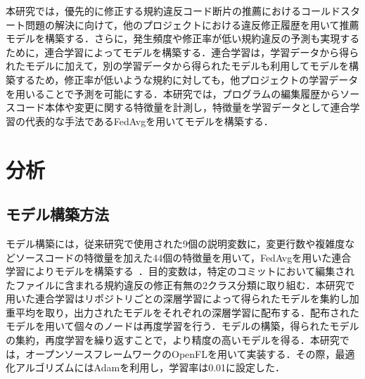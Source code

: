 \documentclass[uplatex,dvipdfmx,a4paper,twocolumn,base=11pt,jbase=11pt,ja=standard]{bxjsarticle}  %
\newcommand{\todo}[1]{\colorbox{yellow}{{\bf TODO}:}{\color{red} {\textbf{[#1]}}}}
\begin{document}
本研究では，優先的に修正する規約違反コード断片の推薦におけるコールドスタート問題の解決に向けて，他のプロジェクトにおける違反修正履歴を用いて推薦モデルを構築する．さらに，発生頻度や修正率が低い規約違反の予測も実現するために，連合学習によってモデルを構築する．連合学習は，学習データから得られたモデルに加えて，別の学習データから得られたモデルも利用してモデルを構築するため，修正率が低いような規約に対しても，他プロジェクトの学習データを用いることで予測を可能にする．本研究では，プログラムの編集履歴からソースコード本体や変更に関する特徴量を計測し，特徴量を学習データとして連合学習の代表的な手法であるFedAvgを用いてモデルを構築する．


\section{分析}

\subsection{モデル構築方法}
モデル構築には，従来研究で使用された9個の説明変数に，変更行数や複雑度などソースコードの特徴量を加えた44個の特徴量を用いて，FedAvgを用いた連合学習によりモデルを構築する~\cite{article2}．目的変数は，特定のコミットにおいて編集されたファイルに含まれる規約違反の修正有無の2クラス分類に取り組む．本研究で用いた連合学習はリポジトリごとの深層学習によって得られたモデルを集約し加重平均を取り，出力されたモデルをそれぞれの深層学習に配布する．配布されたモデルを用いて個々のノードは再度学習を行う．モデルの構築，得られたモデルの集約，再度学習を繰り返すことで，より精度の高いモデルを得る．本研究では，オープンソースフレームワークのOpenFLを用いて実装する．その際，最適化アルゴリズムにはAdamを利用し，学習率は0.01に設定した．

\end{document}

